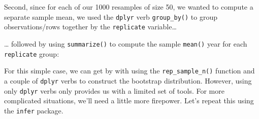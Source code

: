\documentclass[
]{book}
\newenvironment{Shaded}{\begin{snugshade}}{\end{snugshade}}
\newcommand{\DataTypeTok}[1]{\textcolor[rgb]{0.13,0.29,0.53}{#1}}
\newcommand{\DecValTok}[1]{\textcolor[rgb]{0.00,0.00,0.81}{#1}}
\newcommand{\KeywordTok}[1]{\textcolor[rgb]{0.13,0.29,0.53}{\textbf{#1}}}
\newcommand{\NormalTok}[1]{#1}
\newcommand{\OperatorTok}[1]{\textcolor[rgb]{0.81,0.36,0.00}{\textbf{#1}}}
\newcommand{\OtherTok}[1]{\textcolor[rgb]{0.56,0.35,0.01}{#1}}
\newcommand{\StringTok}[1]{\textcolor[rgb]{0.31,0.60,0.02}{#1}}
\begin{document}
\begin{Shaded}
\end{Shaded}

Second, since for each of our 1000 resamples of size 50, we wanted to compute a separate sample mean, we used the \texttt{dplyr} verb \texttt{group\_by()} to group observations/rows together by the \texttt{replicate} variable\ldots{}

\begin{Shaded}
\end{Shaded}

\ldots{} followed by using \texttt{summarize()} to compute the sample \texttt{mean()} year for each \texttt{replicate} group:

\begin{Shaded}
\end{Shaded}

For this simple case, we can get by with using the \texttt{rep\_sample\_n()} function and a couple of \texttt{dplyr} verbs to construct the bootstrap distribution. However, using only \texttt{dplyr} verbs only provides us with a limited set of tools. For more complicated situations, we'll need a little more firepower. Let's repeat this using the \texttt{infer} package.
\end{document}
